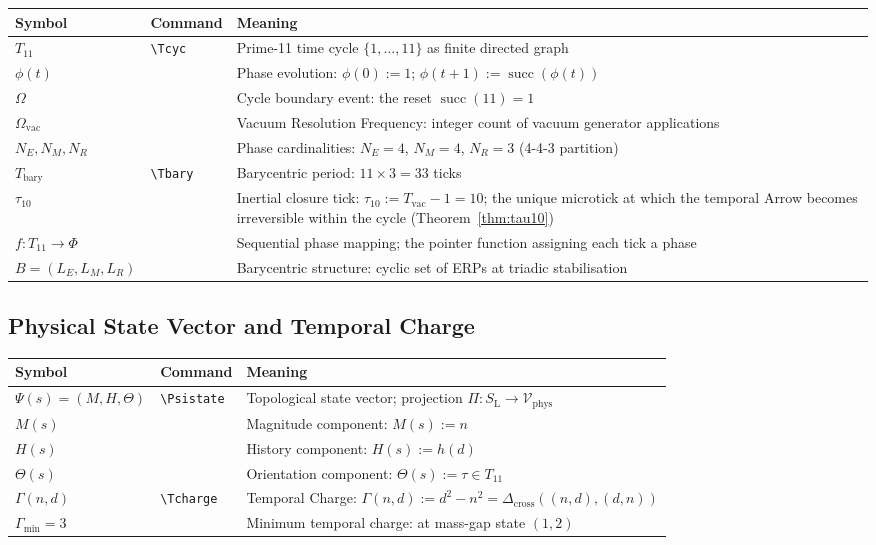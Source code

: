 \documentclass[11pt, letterpaper]{article}
\newcommand{\SL}{S_{\mathrm{L}}}
\renewcommand{\succ}{\operatorname{succ}}
\newcommand{\hfn}{h}
\newcommand{\Dcross}{\Delta_{\mathrm{cross}}}
\newcommand{\Tcyc}{T_{11}}
\newcommand{\PhiSet}{\Phi}
\newcommand{\Tbary}{T_{\mathrm{bary}}}
\newcommand{\Psistate}{\Psi}
\newcommand{\Tcharge}{\Gamma}
\theoremstyle{definition}
\theoremstyle{plain}
\begin{document}
\begin{longtable}{L{2.2cm} L{2.6cm} L{8.5cm}}
\toprule
\textbf{Symbol} & \textbf{Command} & \textbf{Meaning} \\
\midrule\endhead\bottomrule\endfoot

$\Tcyc$ & \verb|\Tcyc| & Prime-11 time cycle $\{1,\dots,11\}$
  as finite directed graph \\[3pt]
$\phi(t)$ & & Phase evolution:
  $\phi(0):=1$; $\phi(t+1):=\succ(\phi(t))$ \\[3pt]
$\Omega$ & & Cycle boundary event: the reset $\succ(11)=1$ \\[3pt]
$\Omega_{\mathrm{vac}}$ & & Vacuum Resolution Frequency:
  integer count of vacuum generator applications \\[3pt]
$N_E,N_M,N_R$ & & Phase cardinalities:
  $N_E=4$, $N_M=4$, $N_R=3$ (4-4-3 partition) \\[3pt]
$\Tbary$ & \verb|\Tbary| & Barycentric period: $11\times 3=33$ ticks \\[3pt]
$\tau_{10}$ & & Inertial closure tick:
  $\tau_{10}:=T_{\mathrm{vac}}-1=10$; the unique microtick at which
  the temporal Arrow becomes irreversible within the cycle
  (Theorem~\ref{thm:tau10}) \\[3pt]
$f:\Tcyc\to\PhiSet$ & & Sequential phase mapping;
  the pointer function assigning each tick a phase \\[3pt]
$B=(L_E,L_M,L_R)$ & & Barycentric structure:
  cyclic set of ERPs at triadic stabilisation \\[3pt]
\end{longtable}

\subsection{Physical State Vector and Temporal Charge}

\begin{longtable}{L{2.5cm} L{2.6cm} L{8.5cm}}
\toprule
\textbf{Symbol} & \textbf{Command} & \textbf{Meaning} \\
\midrule\endhead\bottomrule\endfoot

$\Psistate(s)=(M,H,\Theta)$ & \verb|\Psistate| &
  Topological state vector;
  projection $\Pi:\SL\to\mathcal{V}_{\mathrm{phys}}$ \\[3pt]
$M(s)$ & & Magnitude component: $M(s):=n$ \\[3pt]
$H(s)$ & & History component: $H(s):=\hfn(d)$ \\[3pt]
$\Theta(s)$ & & Orientation component: $\Theta(s):=\tau\in\Tcyc$ \\[3pt]
$\Tcharge(n,d)$ & \verb|\Tcharge| & Temporal Charge:
  $\Tcharge(n,d):=d^2-n^2=\Dcross((n,d),(d,n))$ \\[3pt]
$\Gamma_{\min}=3$ & & Minimum temporal charge:
  at mass-gap state $(1,2)$ \\[3pt]
\end{longtable}
\end{document}
